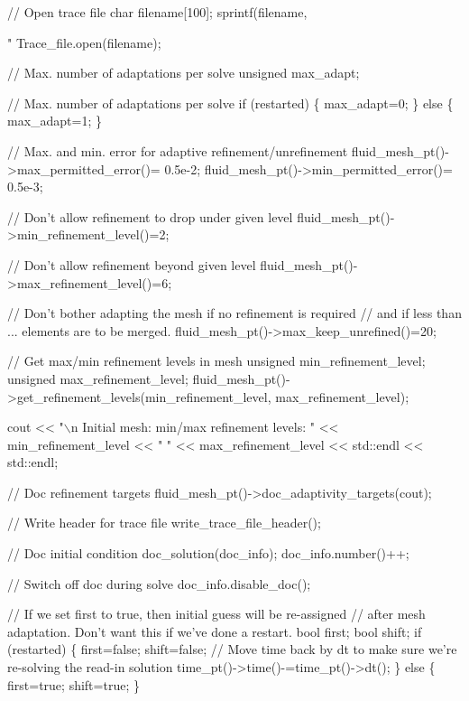 \begin{DoxyCodeInclude}
{{{{{ \textcolor{comment}{// Open trace file}
 \textcolor{keywordtype}{char} filename[100];   
 sprintf(filename,\textcolor{stringliteral}{"%
 Trace\_file.open(filename);

 \textcolor{comment}{// Max. number of adaptations per solve}
 \textcolor{keywordtype}{unsigned} max\_adapt;

 \textcolor{comment}{// Max. number of adaptations per solve}
 \textcolor{keywordflow}{if} (restarted)
  \{
   max\_adapt=0;
  \}
 \textcolor{keywordflow}{else}
  \{
   max\_adapt=1;
  \}
 
 \textcolor{comment}{// Max. and min. error for adaptive refinement/unrefinement}
 fluid\_mesh\_pt()->max\_permitted\_error()=  0.5e-2;   
 fluid\_mesh\_pt()->min\_permitted\_error()=  0.5e-3;  

 \textcolor{comment}{// Don't allow refinement to drop under given level}
 fluid\_mesh\_pt()->min\_refinement\_level()=2;

 \textcolor{comment}{// Don't allow refinement beyond given level }
 fluid\_mesh\_pt()->max\_refinement\_level()=6; 

 \textcolor{comment}{// Don't bother adapting the mesh if no refinement is required}
 \textcolor{comment}{// and if less than ... elements are to be merged.}
 fluid\_mesh\_pt()->max\_keep\_unrefined()=20;


 \textcolor{comment}{// Get max/min refinement levels in mesh}
 \textcolor{keywordtype}{unsigned} min\_refinement\_level;
 \textcolor{keywordtype}{unsigned} max\_refinement\_level;
 fluid\_mesh\_pt()->get\_refinement\_levels(min\_refinement\_level,
                                        max\_refinement\_level);

 cout << \textcolor{stringliteral}{"\(\backslash\)n Initial mesh: min/max refinement levels: "} 
      << min\_refinement\_level << \textcolor{stringliteral}{" "} << max\_refinement\_level << std::endl << std::endl;

 \textcolor{comment}{// Doc refinement targets}
 fluid\_mesh\_pt()->doc\_adaptivity\_targets(cout);

 \textcolor{comment}{// Write header for trace file}
 write\_trace\_file\_header();

 \textcolor{comment}{// Doc initial condition}
 doc\_solution(doc\_info);
 doc\_info.number()++;

 \textcolor{comment}{// Switch off doc during solve}
 doc\_info.disable\_doc();

 \textcolor{comment}{// If we set first to true, then initial guess will be re-assigned}
 \textcolor{comment}{// after mesh adaptation. Don't want this if we've done a restart.}
 \textcolor{keywordtype}{bool} first;
 \textcolor{keywordtype}{bool} shift;
 \textcolor{keywordflow}{if} (restarted)
  \{
   first=\textcolor{keyword}{false};
   shift=\textcolor{keyword}{false};
   \textcolor{comment}{// Move time back by dt to make sure we're re-solving the read-in solution}
   time\_pt()->time()-=time\_pt()->dt();
  \}
 \textcolor{keywordflow}{else}
  \{
   first=\textcolor{keyword}{true};
   shift=\textcolor{keyword}{true};
  \}
 
}}}}}}
\end{DoxyCodeInclude}
